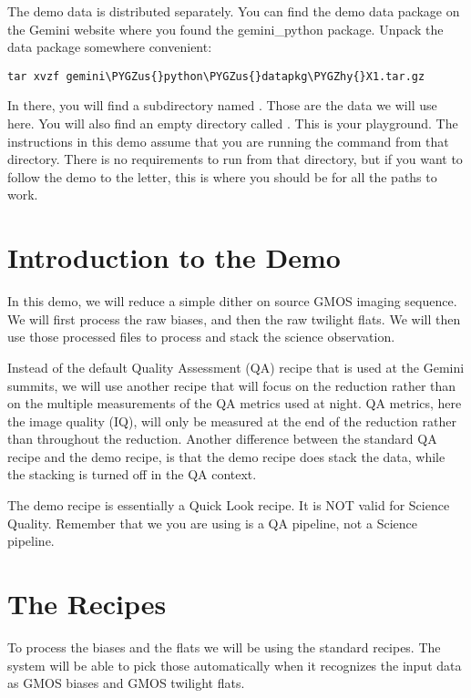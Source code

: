 \documentclass[letterpaper,10pt,english]{sphinxmanual}
\def\PYGZus{\char`\_}
\def\PYGZhy{\char`\-}
\begin{document}
The demo data is distributed separately.  You can find the demo data package
 on the Gemini website where you found the
gemini\_python package.  Unpack the data package somewhere convenient:

\begin{Verbatim}[commandchars=\\\{\}]
tar xvzf gemini\PYGZus{}python\PYGZus{}datapkg\PYGZhy{}X1.tar.gz
\end{Verbatim}

In there, you will find a subdirectory named .  Those are
the data we will use here.  You will also find an empty directory called
.  This is your playground. The instructions in this demo assume that
you are running the  command from that directory.  There is no requirements
to run  from that directory, but if you want to follow the demo to the
letter, this is where you should be for all the paths to work.


\section{Introduction to the Demo}
\label{appendices/appendix_demo:introduction-to-the-demo}
In this demo, we will reduce a simple dither on source GMOS imaging sequence.
We will first process the raw biases, and then the raw twilight flats.  We will
then use those processed files to process and stack the science observation.

Instead of the default Quality Assessment (QA) recipe that is used at the Gemini
summits, we will use another recipe that will focus on the reduction rather
than on the multiple measurements of the QA metrics used at night.  QA metrics,
here the image quality (IQ), will only be measured at the end of the reduction
rather than throughout the reduction.   Another difference between the standard
QA recipe and the demo recipe, is that the demo recipe does stack the data, while
the stacking is turned off in the QA context.

The demo recipe is essentially a Quick Look recipe.  It is NOT valid for Science
Quality.  Remember that we you are using is a QA pipeline, not a Science pipeline.


\section{The Recipes}
\label{appendices/appendix_demo:the-recipes}
To process the biases and the flats we will be using the standard recipes. The
system will be able to pick those automatically when it recognizes the input data
as GMOS biases and GMOS twilight flats.
\end{document}
